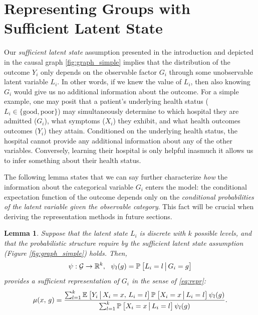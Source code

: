 \documentclass{article}
\theoremstyle{plain}
\newtheorem{lemm}[prop]{Lemma}
\theoremstyle{definition}
\theoremstyle{remark}
\begin{document}
\section{Representing Groups with Sufficient Latent State}

Our \emph{sufficient latent state} assumption presented in the introduction and depicted in the causal graph \ref{fig:graph_simple} implies that the distribution of the outcome $Y_{i}$ only depends on the observable factor $G_{i}$ through some unobservable latent variable $L_{i}$. In other words, if we knew the value of $L_{i}$, then also knowing $G_{i}$ would give us no additional information about the outcome. For a simple example, one may posit that a patient's underlying health status ($L_{i} \in \{\text{good}, \text{poor}\}$) may simultaneously determine to which hospital they are admitted ($G_{i}$), what symptoms ($X_i$) they exhibit, and what health outcomes outcomes ($Y_i$) they attain. Conditioned on the underlying health status, the hospital cannot provide any additional information about any of the other variables. Conversely, learning their hospital is only helpful inasmuch it allows us to infer something about their health status.

The following lemma states that we can say further characterize \emph{how} the information about the categorical variable $G_{i}$ enters the model: the conditional expectation function of the outcome depends only on the \emph{conditional probabilities of the latent variable given the observable category}. This fact will be crucial when deriving the representation methods in future sections.

\begin{lemm}
\label{lemm:repr}
Suppose that the latent state $L_i$ is discrete with $k$ possible levels, and that the probabilistic structure require by the sufficient latent state assumption (Figure \ref{fig:graph_simple}) holds. Then,
\begin{equation}
\label{eq:psi}
\psi: \mathcal{G} \rightarrow \mathbb{R}^k, \ \ \psi_l(g) = \mathbb{P}_{}\left[L_i = l \,\big|\, G_i = g\right]
\end{equation}
provides a sufficient representation of $G_i$ in the sense of \eqref{eq:repr}:
\begin{equation}
\label{eq:explicit}
\mu(x, \, g) = \frac{\sum_{l = 1}^k  \mathbb{E}_{}\left[Y_i \,\big|\, X_i = x, \, L_i = l\right] \mathbb{P}_{}\left[X_i = x \,\big|\, L_i = l\right] \psi_l(g)}{\sum_{l = 1}^k \mathbb{P}_{}\left[X_i = x \,\big|\, L_i = l\right] \psi_l(g)}.
\end{equation}
\end{lemm}
\end{document}
